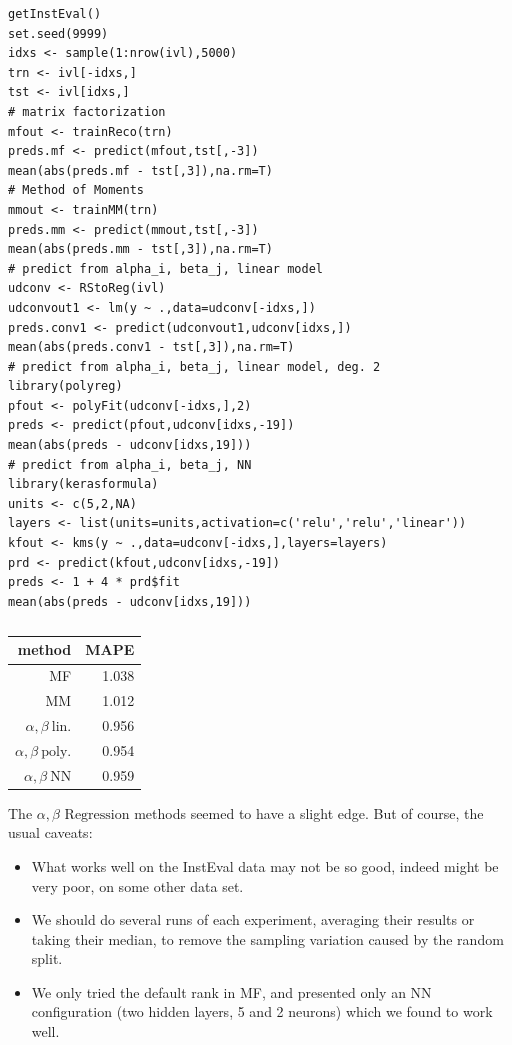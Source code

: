 \begin{lstlisting}
getInstEval()
set.seed(9999)
idxs <- sample(1:nrow(ivl),5000)
trn <- ivl[-idxs,]
tst <- ivl[idxs,]
# matrix factorization
mfout <- trainReco(trn)
preds.mf <- predict(mfout,tst[,-3])
mean(abs(preds.mf - tst[,3]),na.rm=T)  
# Method of Moments
mmout <- trainMM(trn)
preds.mm <- predict(mmout,tst[,-3])  
mean(abs(preds.mm - tst[,3]),na.rm=T)
# predict from alpha_i, beta_j, linear model
udconv <- RStoReg(ivl)
udconvout1 <- lm(y ~ .,data=udconv[-idxs,])
preds.conv1 <- predict(udconvout1,udconv[idxs,])
mean(abs(preds.conv1 - tst[,3]),na.rm=T)  
# predict from alpha_i, beta_j, linear model, deg. 2
library(polyreg)
pfout <- polyFit(udconv[-idxs,],2) 
preds <- predict(pfout,udconv[idxs,-19]) 
mean(abs(preds - udconv[idxs,19])) 
# predict from alpha_i, beta_j, NN
library(kerasformula)
units <- c(5,2,NA)
layers <- list(units=units,activation=c('relu','relu','linear')) 
kfout <- kms(y ~ .,data=udconv[-idxs,],layers=layers) 
prd <- predict(kfout,udconv[idxs,-19]) 
preds <- 1 + 4 * prd$fit
mean(abs(preds - udconv[idxs,19]))
\end{lstlisting}

\begin{table}
\begin{center}
\vskip 0.5in
\begin{tabular}{|r|r|}
\hline
method & MAPE \\ \hline 
\hline
MF & 1.038 \\ \hline 
MM & 1.012 \\ \hline 
$\alpha, \beta ~ \textrm{lin.}$ & 0.956 \\ \hline 
$\alpha, \beta ~ \textrm{poly.}$ & 0.954 \\ \hline 
$\alpha, \beta ~ \textrm{NN}$ & 0.959 \\ \hline 
\end{tabular}
\end{center}
\caption{}
\label{}
\end{table}

The $\alpha, \beta \textrm{ Regression}$ methods seemed to have a slight
edge.  But of course, the usual caveats:

\begin{itemize}

\item What works well on the InstEval data may not be so good, indeed
might be very poor, on some other data set.

\item We should do several runs of each experiment, averaging their
results or taking their median, to remove the sampling variation caused
by the random split.

\item We only tried the default rank in MF, and presented only an
NN configuration (two hidden layers, 5 and 2 neurons) which we found to work well.

\end{itemize} 
